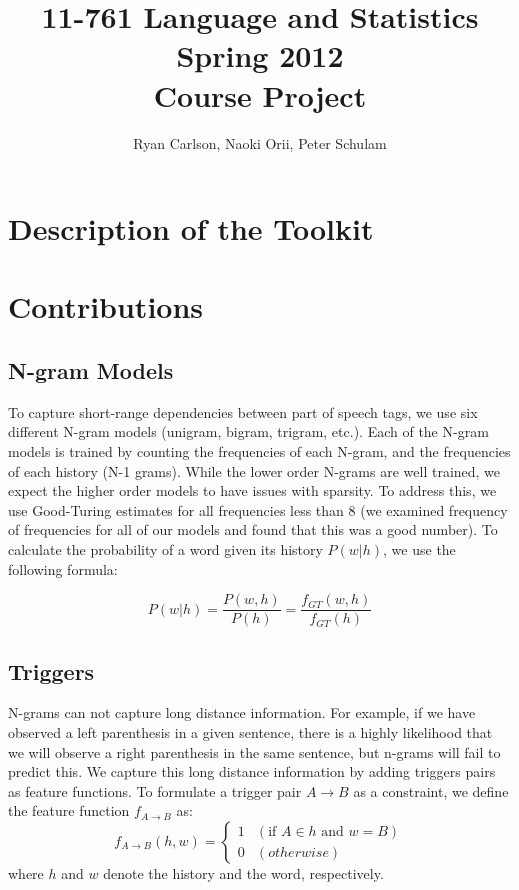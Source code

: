 \documentclass[11pt]{article}
\begin{document}
 

\title{{11-761 Language and Statistics\\Spring 2012\\Course Project}}
\author{Ryan Carlson, Naoki Orii, Peter Schulam}
\maketitle

\section{Description of the Toolkit}

\section{Contributions}

\subsection{N-gram Models}

To capture short-range dependencies between part of speech tags, we use
six different N-gram models (unigram, bigram, trigram, etc.). Each of
the N-gram models is trained by counting the frequencies of each N-gram,
and the frequencies of each history (N-1 grams). While the lower order
N-grams are well trained, we expect the higher order models to have
issues with sparsity. To address this, we use Good-Turing estimates for
all frequencies less than $8$ (we examined frequency of frequencies for
all of our models and found that this was a good number). To calculate
the probability of a word given its history $P(w|h)$, we use the
following formula:

\[
    P(w|h) = \frac{P(w,h)}{P(h)} = \frac{f_{GT}(w,h)}{f_{GT}(h)}
\]

\subsection{Triggers}
N-grams can not capture long distance information.
For example, if we have observed a left parenthesis in a given sentence,
there is a highly likelihood that we will observe a right parenthesis in the same sentence,
but n-grams will fail to predict this.
We capture this long distance information by adding triggers pairs as feature functions.
To formulate a trigger pair $A \rightarrow B$ as a constraint, we define the feature function $f_{A \rightarrow B}$ as:
\[
  f_{A \rightarrow B}(h, w) = \begin{cases}
    1 & (\textrm{if } A \in h \textrm{ and } w = B) \\
    0 & (otherwise)
  \end{cases}
\]
where $h$ and $w$ denote the history and the word, respectively.
\end{document}
